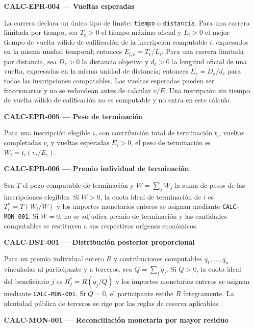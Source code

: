 \documentclass[10pt,letterpaper]{article}
\begin{document}
\noindent\textbf{CALC-EPR-004 --- Vueltas esperadas}\par
La carrera declara un único tipo de límite: \texttt{tiempo} o \texttt{distancia}. Para una carrera limitada por tiempo, sea $T_e>0$ el tiempo máximo oficial y $L_i>0$ el mejor tiempo de vuelta válido de calificación de la inscripción computable $i$, expresados en la misma unidad temporal; entonces $E_{i,e}=T_e/L_i$. Para una carrera limitada por distancia, sea $D_e>0$ la distancia objetivo y $d_e>0$ la longitud oficial de una vuelta, expresadas en la misma unidad de distancia; entonces $E_e=D_e/d_e$ para todas las inscripciones computables. Las vueltas esperadas pueden ser fraccionarias y no se redondean antes de calcular $v/E$. Una inscripción sin tiempo de vuelta válido de calificación no es computable y no entra en este cálculo.\par\vspace{0.5em}
\noindent\textbf{CALC-EPR-005 --- Peso de terminación}\par
Para una inscripción elegible $i$, con contribución total de terminación $t_i$, vueltas completadas $v_i$ y vueltas esperadas $E_i>0$, el peso de terminación es $W_i=t_i(v_i/E_i)$.\par\vspace{0.5em}
\noindent\textbf{CALC-EPR-006 --- Premio individual de terminación}\par
Sea $T$ el pozo computable de terminación y $W=\sum_j W_j$ la suma de pesos de las inscripciones elegibles. Si $W>0$, la cuota ideal de terminación de $i$ es $T_i^*=T(W_i/W)$ y los importes monetarios enteros se asignan mediante \texttt{CALC-MON-001}. Si $W=0$, no se adjudica premio de terminación y las cantidades computables se restituyen a sus respectivos orígenes económicos.\par\vspace{0.5em}
\noindent\textbf{CALC-DST-001 --- Distribución posterior proporcional}\par
Para un premio individual entero $R$ y contribuciones computables $q_1,\ldots,q_n$ vinculadas al participante y a terceros, sea $Q=\sum_j q_j$. Si $Q>0$, la cuota ideal del beneficiario $j$ es $R_j^*=R(q_j/Q)$ y los importes monetarios enteros se asignan mediante \texttt{CALC-MON-001}. Si $Q=0$, el participante recibe $R$ íntegramente. La identidad pública de terceros se rige por las reglas de reserva aplicables.\par\vspace{0.5em}
\noindent\textbf{CALC-MON-001 --- Reconciliación monetaria por mayor residuo}\par
\end{document}
